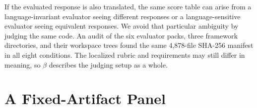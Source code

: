 \documentclass[sigconf,anonymous]{aamas}
\begin{document}
If the evaluated response is also translated, the same score table can
arise from a language-invariant evaluator seeing different responses or a
language-sensitive evaluator seeing equivalent responses. We avoid that
particular ambiguity by judging the same code. An audit of the six
evaluator packs, three framework directories, and their workspace trees
found the same 4{,}878-file SHA-256 manifest in all eight conditions.
The localized rubric and requirements may still differ in meaning, so
$\beta$ describes the judging setup as a whole.

\section{A Fixed-Artifact Panel}
\label{sec:setup}
\end{document}
